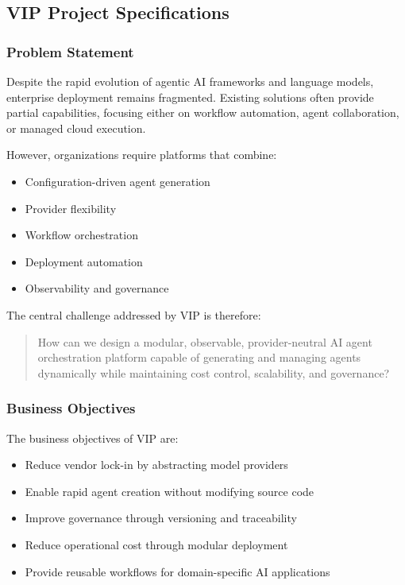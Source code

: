 \subsection{VIP Project Specifications}

\subsubsection{Problem Statement}

Despite the rapid evolution of agentic AI frameworks and language models, enterprise deployment remains fragmented. Existing solutions often provide partial capabilities, focusing either on workflow automation, agent collaboration, or managed cloud execution.

However, organizations require platforms that combine:

\begin{itemize}
    \item Configuration-driven agent generation
    \item Provider flexibility
    \item Workflow orchestration
    \item Deployment automation
    \item Observability and governance
\end{itemize}

The central challenge addressed by VIP is therefore:

\begin{quote}
How can we design a modular, observable, provider-neutral AI agent orchestration platform capable of generating and managing agents dynamically while maintaining cost control, scalability, and governance?
\end{quote}

\subsubsection{Business Objectives}

The business objectives of VIP are:

\begin{itemize}
    \item Reduce vendor lock-in by abstracting model providers
    \item Enable rapid agent creation without modifying source code
    \item Improve governance through versioning and traceability
    \item Reduce operational cost through modular deployment
    \item Provide reusable workflows for domain-specific AI applications
\end{itemize}

